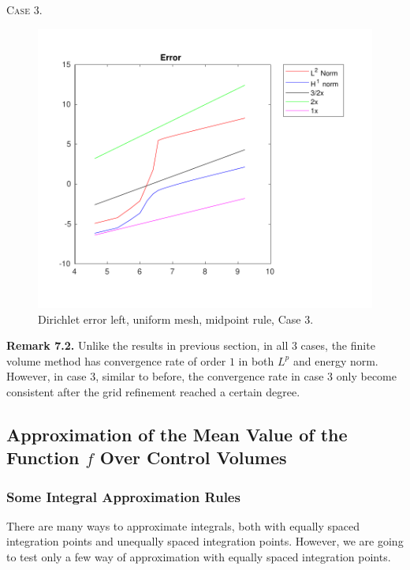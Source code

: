 \documentclass[a4paper]{article}
\numberwithin{equation}{section}
\begin{document}
\newpage
\noindent
\textsc{Case 3.}
\begin{figure}[H]
\centering\includegraphics[width=13.5cm]{fig_dirichlet_error_left_cp_uniform_midpoint_C3_M100}
\caption{Dirichlet error left, uniform mesh, midpoint rule, Case 3.}
\end{figure}
\noindent\textbf{Remark 7.2.} Unlike the results in previous section, in all 3 cases, the finite volume method has convergence rate of order $1$ in both $L^p$ and energy norm. However, in case 3, similar to before, the convergence rate in case 3 only become consistent after the grid refinement reached a certain degree.
\subsection{Approximation of the Mean Value of the Function $f$ Over Control Volumes}
\subsubsection{Some Integral Approximation Rules}
	There are many ways to approximate integrals, both with equally spaced integration points and unequally spaced integration points. However, we are going to test only a few way of approximation with equally spaced integration points.
\end{document}
